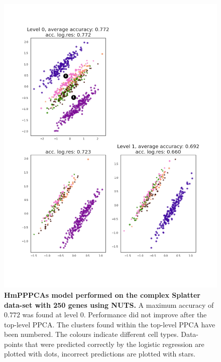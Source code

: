 \begin{figure}
    \centering
    \includegraphics[width=.6\linewidth]{figs/complex_250_nuts.png}
    \caption[HmPPPCAs model performed on the complex Splatter data-set with 250 genes using NUTS]{\small \textbf{HmPPPCAs model performed on the complex Splatter data-set with 250 genes using NUTS.} \small A maximum accuracy of $0.772$ was found at level $0$. Performance did not improve after the top-level PPCA. The clusters found within the top-level PPCA have been numbered. The colours indicate different cell types. Data-points that were predicted correctly by the logistic regression are plotted with dots, incorrect predictions are plotted with stars.}
    \label{fig:complex_250_nuts}
\end{figure}


